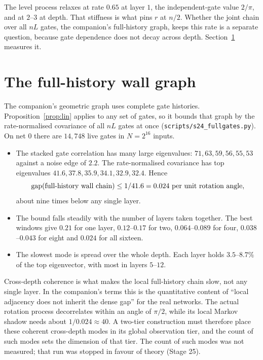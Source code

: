 The level process relaxes at rate $0.65$ at layer $1$, the independent-gate value $2/\pi$, and at $2$--$3$ at depth. That
stiffness is what pins $r$ at $n/2$. Whether the joint chain over all $nL$ gates, the companion's full-history graph,
keeps this rate is a separate question, because gate dependence does not decay across depth. Section~\ref{sec:full}
measures it.

\section{The full-history wall graph}\label{sec:full}

The companion's geometric graph uses complete gate histories. Proposition~\ref{prop:lin} applies to any set of gates, so
it bounds that graph by the rate-normalised covariance of all $nL$ gates at once (\texttt{scripts/s24\_fullgates.py}).
On net 0 there are $14{,}748$ live gates in $N=2^{16}$ inputs.

\begin{itemize}[leftmargin=1.5em]
\item The stacked gate correlation has many large eigenvalues: $71,63,59,56,55,53$ against a noise edge of $2.2$. The
rate-normalised covariance has top eigenvalues $41.6,37.8,35.9,34.1,32.9,32.4$. Hence
\[
\operatorname{gap}(\text{full-history wall chain})\le 1/41.6=0.024\ \text{per unit rotation angle},
\]
about nine times below any single layer.
\item The bound falls steadily with the number of layers taken together. The best windows give $0.21$ for one layer,
$0.12$--$0.17$ for two, $0.064$--$0.089$ for four, $0.038$--$0.043$ for eight and $0.024$ for all sixteen.
\item The slowest mode is spread over the whole depth. Each layer holds $3.5$--$8.7\%$ of the top eigenvector, with most in
layers $5$--$12$.
\end{itemize}

Cross-depth coherence is what makes the local full-history chain slow, not any single layer. In the companion's terms
this is the quantitative content of ``local adjacency does not inherit the dense gap'' for the real networks. The actual
rotation process decorrelates within an angle of $\pi/2$, while its local Markov shadow needs about $1/0.024\approx40$.
A two-tier construction must therefore place these coherent cross-depth modes in its global observation tier, and the
count of such modes sets the dimension of that tier. The count of such modes was not measured; that run was stopped in favour of theory (Stage 25).

